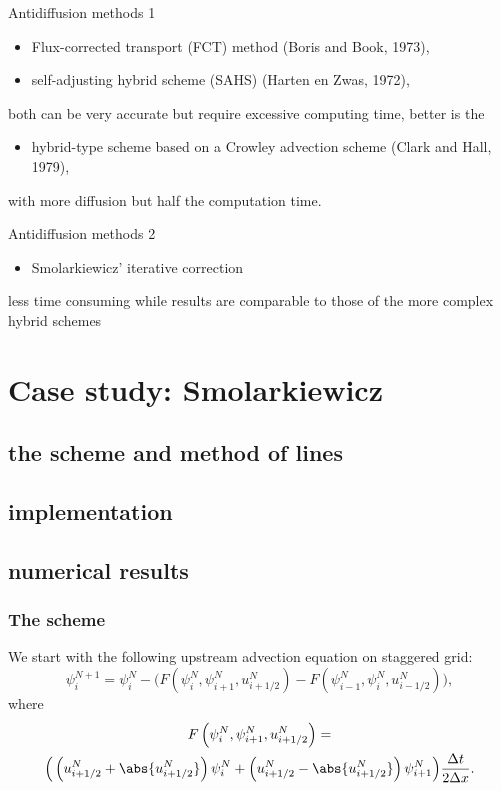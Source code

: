 \documentclass[hyperref={pdfstartview=Fit}]{beamer}
\begin{document}
\begin{frame}{Antidiffusion methods 1}
\begin{itemize}
\item Flux-corrected transport (FCT) method (Boris and Book, 1973),
\item self-adjusting hybrid scheme (SAHS) (Harten en Zwas, 1972),
\end{itemize}
   both can be very accurate but require excessive computing time, better is the
\begin{itemize}
   \item hybrid-type scheme based on a Crowley advection scheme (Clark and Hall, 1979),
\end{itemize}
   with more diffusion but half the computation time.
\end{frame}

\begin{frame}{Antidiffusion methods 2}
\begin{itemize}
\item Smolarkiewicz' iterative correction
\end{itemize}
   less time consuming while results are comparable to those of the more complex hybrid schemes
\end{frame}

\section{Case study: Smolarkiewicz}
\subsection{the scheme and method of lines}
\subsection{implementation}
\subsection{numerical results}

\begin{frame}
\frametitle{The scheme}
We start with the following upstream advection equation on staggered grid:
\begin{equation*}
 \psi_i^{N+1} = \psi_i^N - \Big( F \left( \psi_i^N,\psi_{i+1}^N,u_{i+1/2}^N\right)
-F \left( \psi_{i-1}^N,\psi_{i}^N,u_{i-1/2}^N\right) \Big),
\end{equation*}
where
\begin{multline*}
F \left( \psi_i^N,\psi_{i+1}^N,u_{i+1/2}^N\right) =\\
\Big( \left( u_{i+1/2}^N + \abs{u_{i+1/2}^N} \right) \psi_i^N
+ \left( u_{i+1/2}^N - \abs{u_{i+1/2}^N} \right) \psi_{i+1}^N \Big)
\frac{\Delta t}{2 \Delta x}.
\end{multline*}
\end{frame}
\end{document}
